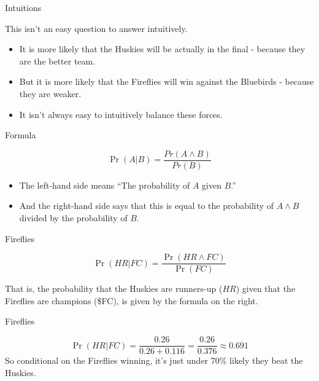\documentclass[
  ignorenonframetext,
]{beamer}
\providecommand{\tightlist}{%
  \setlength{\itemsep}{0pt}\setlength{\parskip}{0pt}}
\renewcommand{\,}{\text{, }}
\begin{document}
\begin{frame}{Intuitions}
\protect\hypertarget{intuitions}{}

This isn't an easy question to answer intuitively.

\begin{itemize}
\tightlist
\item
  It is more likely that the Huskies will be actually in the final -
  because they are the better team.
\item
  But it is more likely that the Fireflies will win against the
  Bluebirds - because they are weaker.
\item
  It isn't always easy to intuitively balance these forces.
\end{itemize}

\end{frame}

\begin{frame}{Formula}
\protect\hypertarget{formula}{}

\[
\Pr(A | B) = \frac{Pr(A \wedge B)}{Pr(B)}
\]

\pause

\begin{itemize}
\tightlist
\item
  The left-hand side means ``The probability of \(A\) given \(B\).''
  \pause
\item
  And the right-hand side says that this is equal to the probability of
  \(A \wedge B\) divided by the probability of \(B\).
\end{itemize}

\end{frame}

\begin{frame}{Fireflies}
\protect\hypertarget{fireflies}{}

\[
\Pr(HR | FC) = \frac{\Pr(HR \wedge FC)}{\Pr(FC)}
\]

That is, the probability that the Huskies are runners-up (\(HR\)) given
that the Fireflies are champions (\$FC), is given by the formula on the
right.

\end{frame}

\begin{frame}{Fireflies}
\protect\hypertarget{fireflies-1}{}

\[
\Pr(HR | FC) = \frac{0.26}{0.26+0.116} = \frac{0.26}{0.376} \approx 0.691
\] So conditional on the Fireflies winning, it's just under 70\% likely
they beat the Huskies.

\end{frame}
\end{document}
